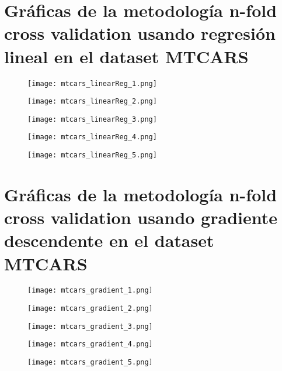 \documentclass[sigconf,authorversion,nonacm]{acmart}
\begin{document}
\section{Gráficas de la metodología n-fold cross validation usando regresión lineal en el dataset MTCARS}
\begin{figure}[H]
  \centering
  \texttt{[image: mtcars\_linearReg\_1.png]}
\end{figure}
\begin{figure}[H]
  \centering
  \texttt{[image: mtcars\_linearReg\_2.png]}
\end{figure}
\begin{figure}[H]
  \centering
  \texttt{[image: mtcars\_linearReg\_3.png]}
\end{figure}
\begin{figure}[H]
  \centering
  \texttt{[image: mtcars\_linearReg\_4.png]}
\end{figure}
\begin{figure}[H]
  \centering
  \texttt{[image: mtcars\_linearReg\_5.png]}
\end{figure}

\clearpage

\section{Gráficas de la metodología n-fold cross validation usando gradiente descendente en el dataset MTCARS}
\begin{figure}[H]
  \centering
  \texttt{[image: mtcars\_gradient\_1.png]}
\end{figure}
\begin{figure}[H]
  \centering
  \texttt{[image: mtcars\_gradient\_2.png]}
\end{figure}
\begin{figure}[H]
  \centering
  \texttt{[image: mtcars\_gradient\_3.png]}
\end{figure}
\begin{figure}[H]
  \centering
  \texttt{[image: mtcars\_gradient\_4.png]}
\end{figure}
\begin{figure}[H]
  \centering
  \texttt{[image: mtcars\_gradient\_5.png]}
\end{figure}

\lstset{style=customstyle}
\end{document}
